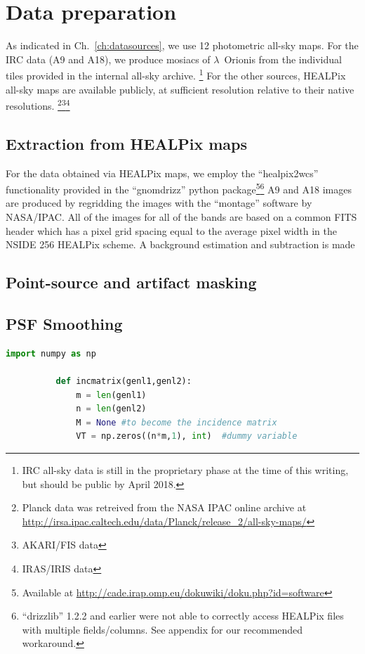 	\section{Data preparation}
		As indicated in Ch.~\ref{ch:datasources}, we use 12 photometric all-sky maps. For the IRC data (A9 and A18), we produce mosiacs of $\lambda$~Orionis from the individual tiles provided in the internal all-sky archive.
      \footnote{IRC all-sky data is still in the proprietary phase at the time of this writing, but should be public by April 2018.}
       For the other sources, HEALPix all-sky maps are available publicly, at sufficient resolution relative to their native resolutions. \footnote{Planck data was retreived from the NASA IPAC online archive at \url{http://irsa.ipac.caltech.edu/data/Planck/release_2/all-sky-maps/}}\footnote{AKARI/FIS data }\footnote{IRAS/IRIS data }

		\subsection{Extraction from HEALPix maps}
		  For the data obtained via HEALPix maps, we employ the ``healpix2wcs'' functionality provided in the ``gnomdrizz'' python package\footnote{Available at \url{http://cade.irap.omp.eu/dokuwiki/doku.php?id=software}}\footnote{``drizzlib'' 1.2.2 and earlier were not able to correctly access HEALPix files with multiple fields/columns. See appendix for our recommended workaround.} A9 and A18 images are produced by regridding the images with the ``montage'' software by NASA/IPAC. All of the images for all of the bands are based on a common FITS header which has a pixel grid spacing equal to the average pixel width in the NSIDE 256 HEALPix scheme.
      A background estimation and subtraction is made

      \subsection{Point-source and artifact masking}

      \subsection{PSF Smoothing}
        \begin{lstlisting}[language=Python]
          import numpy as np

          def incmatrix(genl1,genl2):
              m = len(genl1)
              n = len(genl2)
              M = None #to become the incidence matrix
              VT = np.zeros((n*m,1), int)  #dummy variable
        \end{lstlisting}

